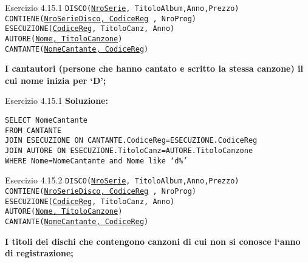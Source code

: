\begin{frame}{Esercizio 4.15.1}
    \texttt{DISCO(\underline{NroSerie}, TitoloAlbum,Anno,Prezzo)\\
    CONTIENE(\underline{NroSerieDisco, CodiceReg} , NroProg)\\
    ESECUZIONE(\underline{CodiceReg}, TitoloCanz, Anno)\\
    AUTORE(\underline{Nome, TitoloCanzone})\\
    CANTANTE(\underline{NomeCantante, CodiceReg})}
    \vspace{1em}
    
    \textbf{I cantautori (persone che hanno cantato e scritto la stessa canzone) il cui nome inizia per `D';}
\end{frame}

\begin{frame}{Esercizio 4.15.1}
    \textbf{Soluzione:}
    \vspace{1em}
    
    \texttt{SELECT NomeCantante\\FROM CANTANTE \\JOIN ESECUZIONE ON CANTANTE.CodiceReg=ESECUZIONE.CodiceReg\\JOIN AUTORE ON ESECUZIONE.TitoloCanz=AUTORE.TitoloCanzone\\WHERE Nome=NomeCantante and Nome like `d\%'}
    \end{frame}
\begin{frame}{Esercizio 4.15.2}
    \texttt{DISCO(\underline{NroSerie}, TitoloAlbum,Anno,Prezzo)\\
    CONTIENE(\underline{NroSerieDisco, CodiceReg} , NroProg)\\
    ESECUZIONE(\underline{CodiceReg}, TitoloCanz, Anno)\\
    AUTORE(\underline{Nome, TitoloCanzone})\\
    CANTANTE(\underline{NomeCantante, CodiceReg})}
    \vspace{1em}
    
    \textbf{I titoli dei dischi che contengono canzoni di cui non si conosce l`anno di registrazione;}
\end{frame}

